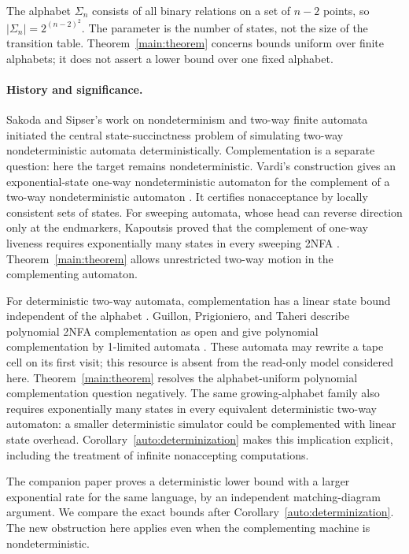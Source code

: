 The alphabet $\Sigma_n$ consists of all binary relations on a set of
$n-2$ points, so $|\Sigma_n|=2^{(n-2)^2}$. The parameter is the
number of states, not the size of the transition table. Theorem~\ref{main:theorem}
concerns bounds uniform over finite alphabets; it does not assert a lower
bound over one fixed alphabet.

\paragraph{History and significance.}
Sakoda and Sipser's work on nondeterminism and two-way finite automata
\cite{SakodaSipser1978} initiated the central state-succinctness problem of
simulating two-way nondeterministic automata deterministically.
Complementation is a separate question: here the target remains
nondeterministic. Vardi's construction gives an exponential-state
one-way nondeterministic automaton for the complement of a two-way
nondeterministic automaton \cite[Theorem~3.2]{Vardi1989}. It certifies
nonacceptance by locally consistent sets of states. For sweeping
automata, whose head can reverse direction only at the endmarkers,
Kapoutsis proved that the complement of one-way liveness requires
exponentially many states in every sweeping 2NFA
\cite[Theorem~1]{Kapoutsis2006}. Theorem~\ref{main:theorem}
allows unrestricted two-way motion in the complementing automaton.

For deterministic two-way automata, complementation
has a linear state bound independent of the alphabet
\cite{GeffertMereghettiPighizzini2007}.
Guillon, Prigioniero, and Taheri describe polynomial 2NFA
complementation as open \cite[Section~1]{GuillonPrigionieroTaheri2026}
and give polynomial complementation by 1-limited automata
\cite[Theorem~4.1]{GuillonPrigionieroTaheri2026}. These automata may
rewrite a tape cell on its first visit; this resource is absent from
the read-only model considered here.
Theorem~\ref{main:theorem} resolves the alphabet-uniform polynomial
complementation question negatively. The same growing-alphabet family
also requires exponentially many states in every equivalent deterministic
two-way automaton: a smaller deterministic simulator could be
complemented with linear state overhead. Corollary~\ref{auto:determinization}
makes this implication explicit, including the treatment of infinite
nonaccepting computations.

The companion paper \cite[Theorem~1.1]{CompanionDeterminization2026}
proves a deterministic lower bound with a larger exponential rate for the
same language, by an independent matching-diagram argument. We compare
the exact bounds after Corollary~\ref{auto:determinization}. The new
obstruction here applies even when the complementing machine is
nondeterministic.

